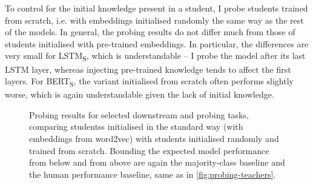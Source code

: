 \documentclass[bsc,frontabs,twoside,singlespacing,parskip,deptreport]{infthesis}
\def\BERTS{BERT\textsubscript{S}}
\def\LSTMS{LSTM\textsubscript{S}}
\begin{document}
{{{      To control for the initial knowledge present in a student, I probe students trained from scratch, i.e. with embeddings initialised randomly the same way as the rest of the models. In general, the probing results do not differ much from those of students initialised with pre-trained embeddings. In particular, the differences are very small for \LSTMS, which is understandable -- I probe the model after its last LSTM layer, whereas injecting pre-trained knowledge tends to affect the first layers. For \BERTS, the variant initialised from scratch often performs slightly worse, which is again understandable given the lack of initial knowledge.

      \begin{figure}[h!tb]
        \centering
        \caption{Probing results for selected downstream and probing tasks, comparing studentss initialised in the standard way (with embeddings from word2vec) with students initialised randomly and trained from scratch. Bounding the expected model performance from below and from above are again the majority-class baseline and the human performance baseline, same as in \autoref{fig:probing-teachers}.}
        \label{fig:probing-students-scratch-selected}
      \end{figure}

}}}
\end{document}
